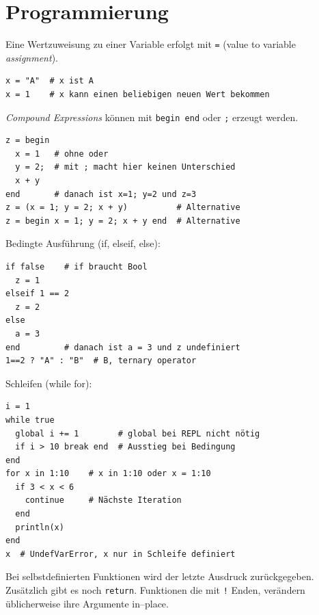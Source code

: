 \documentclass[10pt,twocolumn]{scrartcl}
\begin{document}
\section{Programmierung}
\label{sec:programmierung}

Eine Wertzuweisung zu einer Variable erfolgt mit \lstinline|=| (value to variable \emph{assignment}).

\begin{lstlisting}
x = "A"  # x ist A
x = 1    # x kann einen beliebigen neuen Wert bekommen
\end{lstlisting}

\emph{Compound Expressions} können mit \lstinline|begin end| oder \lstinline|;|
erzeugt werden.

\begin{lstlisting}
z = begin
  x = 1   # ohne oder 
  y = 2;  # mit ; macht hier keinen Unterschied
  x + y
end       # danach ist x=1; y=2 und z=3
z = (x = 1; y = 2; x + y)          # Alternative
z = begin x = 1; y = 2; x + y end  # Alternative
\end{lstlisting}

Bedingte Ausführung (if, elseif, else):

\begin{lstlisting}
if false    # if braucht Bool
  z = 1
elseif 1 == 2
  z = 2
else
  a = 3
end         # danach ist a = 3 und z undefiniert
1==2 ? "A" : "B"  # B, ternary operator
\end{lstlisting}

Schleifen (while for):

\begin{lstlisting}
i = 1
while true
  global i += 1        # global bei REPL nicht nötig
  if i > 10 break end  # Ausstieg bei Bedingung
end
for x in 1:10    # x in 1:10 oder x = 1:10
  if 3 < x < 6
    continue     # Nächste Iteration
  end
  println(x)
end
x  # UndefVarError, x nur in Schleife definiert
\end{lstlisting}

Bei selbstdefinierten Funktionen wird der letzte Ausdruck zurückgegeben.
Zusätzlich gibt es noch \lstinline|return|. Funktionen die mit \lstinline|!|
Enden, verändern üblicherweise ihre Argumente in--place.
\end{document}
